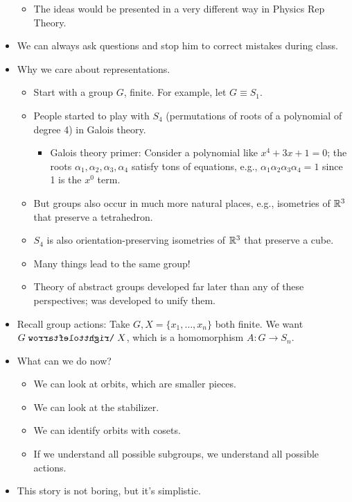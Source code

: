 \documentclass[../notes.tex]{subfiles}
\begin{document}
\begin{itemize}
    \begin{itemize}
        \item The ideas would be presented in a very different way in Physics Rep Theory.
    \end{itemize}
    \item We can always ask questions and stop him to correct mistakes during class.
    \item Why we care about representations.
    \begin{itemize}
        \item Start with a group $G$, finite. For example, let $G\equiv S_1$.
        \item People started to play with $S_4$ (permutations of roots of a polynomial of degree 4) in Galois theory.
        \begin{itemize}
            \item Galois theory primer: Consider a polynomial like $x^4+3x+1=0$; the roots $\alpha_1,\alpha_2,\alpha_3,\alpha_4$ satisfy tons of equations, e.g., $\alpha_1\alpha_2\alpha_3\alpha_4=1$ since 1 is the $x^0$ term.
        \end{itemize}
        \item But groups also occur in much more natural places, e.g., isometries of $\mathbb{R}^3$ that preserve a tetrahedron.
        \item $S_4$ is also orientation-preserving isometries of $\mathbb{R}^3$ that preserve a cube.
        \item Many things lead to the same group!
        \item Theory of abstract groups developed far later than any of these perspectives; was developed to unify them.
    \end{itemize}
    \item Recall group actions: Take $G,X=\{x_1,\dots,x_n\}$ both finite. We want $G\acts X$, which is a homomorphism $A:G\to S_n$.
    \item What can we do now?
    \begin{itemize}
        \item We can look at orbits, which are smaller pieces.
        \item We can look at the stabilizer.
        \item We can identify orbits with cosets.
        \item If we understand all possible subgroups, we understand all possible actions.
    \end{itemize}
    \item This story is not boring, but it's simplistic.

\end{itemize}
\end{document}
